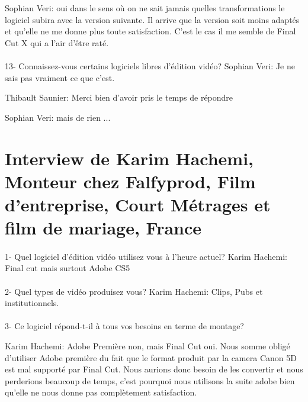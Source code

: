 Sophian Veri: oui dans le sens où on ne sait jamais quelles transformations le
logiciel subira avec la version suivante. Il arrive que la version soit moins adaptés
et qu'elle ne me donne plus toute satisfaction. C'est le cas il me semble de Final Cut
X qui a l'air d'être raté.

\paragraph{}
13- Connaissez-vous certains logiciels libres d'édition vidéo?
Sophian Veri: Je ne sais pas vraiment ce que c'est.

Thibault Saunier: Merci bien d'avoir pris le temps de répondre

Sophian Veri: mais de rien ...

\section*{Interview de Karim Hachemi, Monteur chez Falfyprod, Film d'entreprise,
Court Métrages et film de mariage, France}

\paragraph{}
1-  Quel logiciel d'édition vidéo utilisez vous à l'heure actuel?
Karim Hachemi: Final cut mais surtout Adobe CS5

\paragraph{}
2- Quel types de vidéo produisez vous?
Karim Hachemi: Clips, Pubs et institutionnels.

\paragraph{}
3- Ce logiciel répond-t-il à tous vos besoins en terme de montage?

Karim Hachemi: Adobe Première non, mais Final Cut oui.
Nous somme obligé d'utiliser Adobe première du fait que
le format produit par la camera Canon 5D est mal supporté par Final Cut.
Nous aurions donc besoin de les convertir et nous perderions beaucoup de
temps, c'est pourquoi nous utilisons la suite adobe bien qu'elle ne nous donne
pas complètement satisfaction.

\paragraph{}

